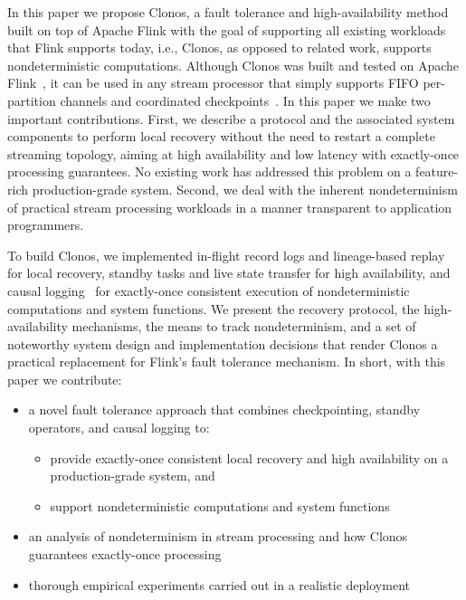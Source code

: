\documentclass[sigconf]{acmart}
\begin{document}
In this paper we propose Clonos, a fault tolerance and high-availability method built on top of Apache Flink with the goal of supporting all existing workloads that Flink supports today, i.e., Clonos, as opposed to related work, supports nondeterministic computations. Although Clonos was built and tested on Apache Flink~\cite{CarboneKE15}, it can be used in any stream processor that simply supports FIFO per-partition channels and coordinated checkpoints~\cite{chandy1985distributed}.
In this paper we make two important contributions. First, we describe a protocol and the associated system components to perform local recovery without the need to restart a complete streaming topology, aiming at high availability and low latency with exactly-once processing guarantees. No existing work has addressed this problem on a feature-rich production-grade system. Second, we deal with the inherent nondeterminism of practical stream processing workloads in a manner transparent to application programmers.

To build Clonos, we implemented in-flight record logs and lineage-based replay for local recovery, standby tasks and live state transfer for high availability, and causal logging~\cite{elnozahy1992manetho} for exactly-once consistent execution of nondeterministic computations and system functions. We present the recovery protocol, the high-availability mechanisms, the means to track nondeterminism, and a set of noteworthy system design and implementation decisions that render Clonos a practical replacement for Flink's fault tolerance mechanism. In short, with this paper we contribute:
\begin{itemize}
  \item a novel fault tolerance approach that combines checkpointing, standby operators, and causal logging to:
  \begin{itemize}
    \item provide exactly-once consistent local recovery and high availability on a production-grade system, and
    \item support nondeterministic computations and system functions
  \end{itemize}
    \item an analysis of nondeterminism in stream processing and how Clonos guarantees exactly-once processing
  \item thorough empirical experiments carried out in a realistic deployment
\end{itemize}
\end{document}

